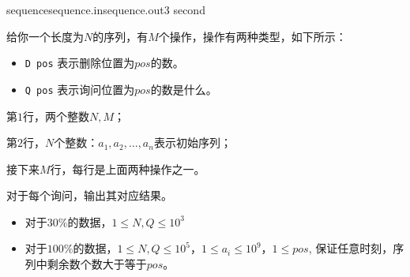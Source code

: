\documentclass[11pt,a4paper,oneside]{article}
\begin{document}
\begin{problem}{sequence}{sequence.in}{sequence.out}{3 second} 
	
	给你一个长度为$N$的序列，有$M$个操作，操作有两种类型，如下所示：
	
	\begin{itemize}
		\item \verb|D pos| 表示删除位置为$pos$的数。
		\item \verb|Q pos| 表示询问位置为$pos$的数是什么。
	\end{itemize}
	

	\InputFile
	
	第$1$行，两个整数$N, M$；
	
	第$2$行，$N$个整数：$a_1,a_2,\dots,a_n$表示初始序列；
	
	接下来$M$行，每行是上面两种操作之一。
	
	\OutputFile
	
	对于每个询问，输出其对应结果。
	
	\Example
	
	\begin{example}
\end{example}

\Note

\begin{itemize}
	\item 对于$30\%$的数据，$1 \leq N, Q \leq 10^3$
	\item 对于$100\%$的数据，$1 \leq N, Q \leq 10^5$，$1 \leq a_i \leq 10^9$，$1 \leq pos$, 保证任意时刻，序列中剩余数个数大于等于$pos$。
\end{itemize}

\end{problem}
\end{document}
